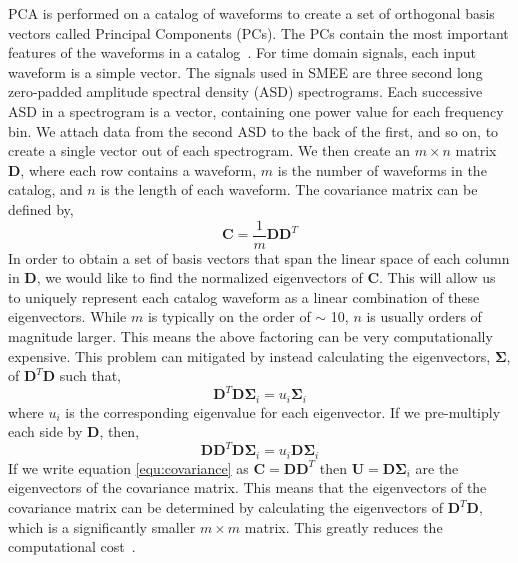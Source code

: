 PCA is performed on a catalog of waveforms to create a set of orthogonal basis vectors called Principal Components (PCs). The PCs contain the most important features of the waveforms in a catalog~\cite{logue:12, powell:16b, 2017PhRvD..96l3013P, heng:09}. For time domain signals, each input waveform is a simple vector. The signals used in SMEE are three second long zero-padded amplitude spectral density (ASD) spectrograms. Each successive ASD in a spectrogram is a vector, containing one power value for each frequency bin. We attach data from the second ASD to the back of the first, and so on, to create a single vector out of each spectrogram. We then create an $m \times n$ matrix $\textbf{D}$, where each row contains a waveform, $m$ is the number of waveforms in the catalog, and $n$ is the length of each waveform. The covariance matrix can be defined by,
\begin{equation}
    \label{equ:covariance}
    \textbf{C} = \frac{1}{m}\textbf{D}\textbf{D}^{T}
\end{equation}
In order to obtain a set of basis vectors that span the linear space of each column in $\textbf{D}$, we would like to find the normalized eigenvectors of $\textbf{C}$. This will allow us to uniquely represent each catalog waveform as a linear combination of these eigenvectors. While $m$ is typically on the order of $\sim$ 10, $n$ is usually orders of magnitude larger. This means the above factoring can be very computationally expensive. This problem can mitigated by instead calculating the eigenvectors, $\boldsymbol\Sigma$, of $\textbf{D}^{T}\textbf{D}$ such that,
\begin{equation}
    \textbf{D}^{T}\textbf{D}\boldsymbol\Sigma_{i} = u_{i}\boldsymbol\Sigma_{i}
\end{equation}
where $u_{i}$ is the corresponding eigenvalue for each eigenvector. If we pre-multiply each side by $\textbf{D}$, then,
\begin{equation}
    \textbf{D}\textbf{D}^{T}\textbf{D}\boldsymbol\Sigma_{i} = u_{i}\textbf{D}\boldsymbol\Sigma_{i}
\end{equation}
If we write equation \ref{equ:covariance} as $\textbf{C} = \textbf{D}\textbf{D}^{T}$ then $\textbf{U} = \textbf{D}\boldsymbol\Sigma_{i}$ are the eigenvectors of the covariance matrix. This means that the eigenvectors of the covariance matrix can be determined by calculating the eigenvectors of $\textbf{D}^{T}\textbf{D}$, which is a significantly smaller $m \times m$ matrix. This greatly reduces the computational cost~\cite{heng:09}.

